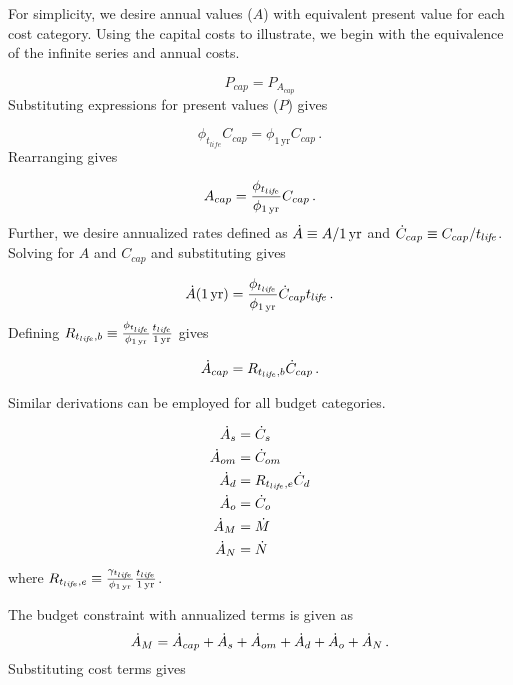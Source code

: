 For simplicity, we desire annual values ($A$)
with equivalent present value for each cost category. 
Using the capital costs to illustrate, 
we begin with the equivalence of the infinite series and 
annual costs.

\begin{equation}
  P_{cap} = P_{A_{cap}}
\end{equation}
%
Substituting expressions for present values ($P$) gives

\begin{equation}
  \phi_{t_{life}} C_{cap} = \phi_{1\,\mathrm{yr}} C_{cap} \, .
\end{equation}
%
Rearranging gives

\begin{equation}
  A_{cap} = \frac{\phi_{t_{li\!f\!e}}}{\phi_{1\,\mathrm{yr}}} C_{cap} \, .
\end{equation}
%
Further, we desire annualized rates defined as
$\dot{A} \equiv A/1\,\mathrm{yr}$ and 
$\dot{C}_{cap} \equiv C_{cap}/t_{li\!f\!e}$.
Solving for $A$ and $C_{cap}$ and substituting gives

\begin{equation}
  \dot{A} (1\,\mathrm{yr}) = \frac{\phi_{t_{li\!f\!e}}}{\phi_{1\,\mathrm{yr}}} \dot{C}_{cap} t_{li\!f\!e} \, .
\end{equation}
%
Defining $R_{t_{li\!f\!e},b} \equiv \frac{\phi_{t_{li\!f\!e}}}{\phi_{1\,\mathrm{yr}}} \frac{t_{li\!f\!e}}{1\,\mathrm{yr}}$ gives

\begin{equation}
  \dot{A}_{cap} = R_{t_{li\!f\!e},b} \dot{C}_{cap} \, .
\end{equation}

Similar derivations can be employed for all budget categories.

\begin{align}
  \dot{A}_s &= \dot{C}_s \\
  \dot{A}_{om} &= \dot{C}_{om} \\
  \dot{A}_d &= R_{t_{li\!f\!e},e} \dot{C}_d \\
  \dot{A}_o &= \dot{C}_o \\
  \dot{A}_M &= \dot{M} \\
  \dot{A}_N &= \dot{N}
\end{align}
%
where $R_{t_{li\!f\!e},e} \equiv \frac{\gamma_{t_{li\!f\!e}}}{\phi_{1\,\mathrm{yr}}} \frac{t_{li\!f\!e}}{1\,\mathrm{yr}}$.

The budget constraint with annualized terms is given as
%
\begin{equation}
  \dot{A}_M = \dot{A}_{cap} + 
               \dot{A}_s + 
               \dot{A}_{om} + 
               \dot{A}_d + 
               \dot{A}_o + 
               \dot{A}_N \, .
\end{equation}
%
Substituting cost terms gives

